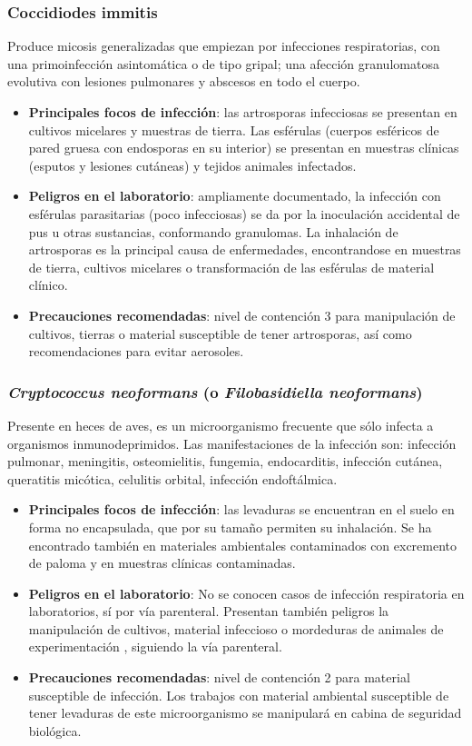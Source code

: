 \subsubsection{Coccidiodes immitis}
Produce micosis generalizadas que empiezan por infecciones respiratorias, con una primoinfección asintomática o de tipo gripal; una afección granulomatosa evolutiva con lesiones pulmonares y abscesos en todo el cuerpo.
\begin{itemize}[itemsep=0pt,parsep=0pt,topsep=0pt,partopsep=0pt]
    \item \textbf{Principales focos de infección}: las artrosporas infecciosas se presentan en cultivos micelares y muestras de tierra. Las esférulas (cuerpos esféricos de pared gruesa con endosporas en su interior) se presentan en muestras clínicas (esputos y lesiones cutáneas) y tejidos animales infectados.
    \item \textbf{Peligros en el laboratorio}: ampliamente documentado, la infección con esférulas parasitarias (poco infecciosas) se da por la inoculación accidental de pus u otras sustancias, conformando granulomas. La inhalación de artrosporas es la principal causa de enfermedades, encontrandose en muestras de tierra, cultivos micelares o transformación de las esférulas de material clínico.
    \item \textbf{Precauciones recomendadas}: nivel de contención 3 para manipulación de cultivos, tierras o material susceptible de tener artrosporas, así como recomendaciones para evitar aerosoles.
\end{itemize}
\subsubsection{\textit{Cryptococcus neoformans} (o \textit{Filobasidiella neoformans})}
Presente en heces de aves, es un microorganismo frecuente que sólo infecta a organismos inmunodeprimidos. Las manifestaciones de la infección son: infección pulmonar, meningitis, osteomielitis, fungemia, endocarditis, infección cutánea, queratitis micótica, celulitis orbital, infección endoftálmica.
\begin{itemize}[itemsep=0pt,parsep=0pt,topsep=0pt,partopsep=0pt]
    \item \textbf{Principales focos de infección}: las levaduras se encuentran en el suelo en forma no encapsulada, que por su tamaño permiten su inhalación. Se ha encontrado también en materiales ambientales contaminados con excremento de paloma y en muestras clínicas contaminadas.
    \item \textbf{Peligros en el laboratorio}: No se conocen casos de infección respiratoria en laboratorios, sí por vía parenteral. Presentan también peligros la manipulación de cultivos, material infeccioso o mordeduras de animales de experimentación , siguiendo la vía parenteral.
    \item \textbf{Precauciones recomendadas}: nivel de contención 2 para material susceptible de infección. Los trabajos con material ambiental susceptible de tener levaduras de este microorganismo se manipulará en cabina de seguridad biológica.
\end{itemize}
